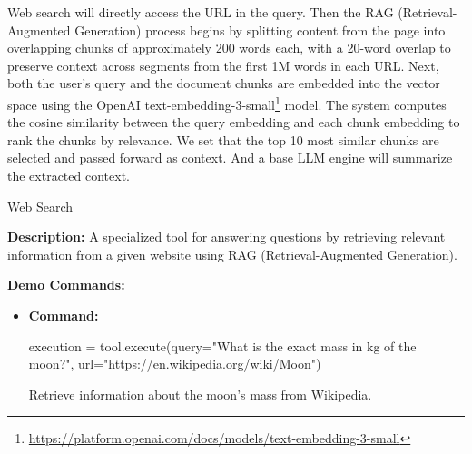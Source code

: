 Web search will directly access the URL in the query. Then the RAG (Retrieval-Augmented Generation) process begins by splitting content from the page into overlapping chunks of approximately 200 words each, with a 20-word overlap to preserve context across segments from the first 1M words in each URL. Next, both the user's query and the document chunks are embedded into the vector space using the OpenAI {text-embedding-3-small\footnote{\url{https://platform.openai.com/docs/models/text-embedding-3-small}}} model. The system computes the cosine similarity between the query embedding and each chunk embedding to rank the chunks by relevance. We set that the top 10 most similar chunks are selected and passed forward as context. And a base LLM engine will summarize the extracted context. 

\begin{tooldescbox}{{Web Search}}
\setlength{\parindent}{0pt}

\textbf{Description:} A specialized tool for answering questions by retrieving relevant information from a given website using RAG (Retrieval-Augmented Generation).

\vspace{6pt}


\vspace{4pt}


\vspace{4pt}


\vspace{6pt}

\textbf{Demo Commands:}
\begin{itemize}[left=0pt, label={}, itemsep=0pt, parsep=0pt]
\item \textbf{Command:} 
\begin{simplecode}
{{execution = tool.execute(query="What is the exact mass in kg of the moon?", url="https://en.wikipedia.org/wiki/Moon")}}
\end{simplecode}

    \enspace{} Retrieve information about the moon's mass from Wikipedia.
    
    \vspace{4pt}
    

\end{itemize}
\end{tooldescbox}
